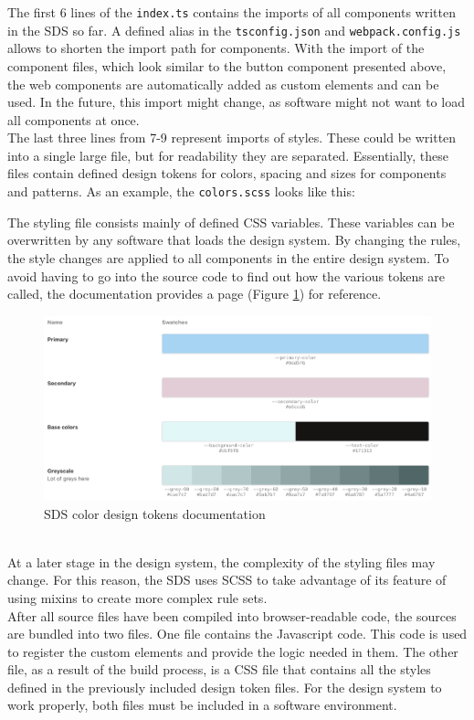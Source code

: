 
The first 6 lines of the \texttt{index.ts} contains the imports of all components written in the \ac{SDS} so far. A defined alias in the \texttt{tsconfig.json} and \texttt{webpack.config.js} allows to shorten the import path for components. With the import of the component files, which look similar to the button component presented above, the web components are automatically added as custom elements and can be used. In the future, this import might change, as software might not want to load all components at once. \\
The last three lines from 7-9 represent imports of styles. These could be written into a single large file, but for readability they are separated. Essentially, these files contain defined design tokens for colors, spacing and sizes for components and patterns. As an example, the \texttt{colors.scss} looks like this:

The styling file consists mainly of defined CSS variables. These variables can be overwritten by any software that loads the design system. By changing the rules, the style changes are applied to all components in the entire design system. To avoid having to go into the source code to find out how the various tokens are called, the documentation provides a page (Figure \ref{sds_color_design_tokens}) for reference.
\begin{figure}[htbp]
    \centerline{\includegraphics[width=\linewidth]{images/color_design_tokens.png}}
    \caption{\ac{SDS} color design tokens documentation}
    \label{sds_color_design_tokens}
\end{figure} \\
At a later stage in the design system, the complexity of the styling files may change. For this reason, the \ac{SDS} uses SCSS to take advantage of its feature of using mixins to create more complex rule sets.\citep{scss_sass_nodate} \\
After all source files have been compiled into browser-readable code, the sources are bundled into two files. One file contains the Javascript code. This code is used to register the custom elements and provide the logic needed in them. The other file, as a result of the build process, is a CSS file that contains all the styles defined in the previously included design token files. For the design system to work properly, both files must be included in a software environment. \\

